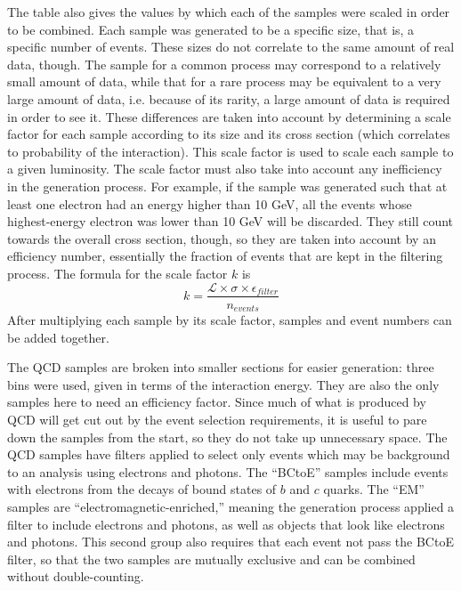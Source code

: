 The table also gives the values by which each 
of the samples were scaled in order to be combined.  
Each sample was generated to be a specific size, 
that is, a specific number of events.  
These sizes do not correlate to the same amount 
of real data, though.  
The sample for a common process may correspond 
to a relatively small amount of data, 
while that for a rare process may be equivalent 
to a very large amount of data, %
i.e. because of its rarity, a large amount 
of data is required in order to see it.  
These differences are taken into account by 
determining a scale factor for each sample 
according to its size and its cross section 
(which correlates to probability of the interaction).  
This scale factor is used to scale each sample 
to a given luminosity.  
The scale factor must also take into account 
any inefficiency in the generation process.  
For example, if the sample was generated such that 
at least one electron had an energy higher than 10 GeV, 
all the events whose highest-energy electron was 
lower than 10 GeV will be discarded.  
They still count towards the overall cross section, 
though, so they are taken into account by 
an efficiency number, 
essentially the fraction of events that are kept 
in the filtering process.  
The formula for the scale factor $k$ is 
\[
k = \frac{ \mathcal{L} \times \sigma \times \epsilon_{filter} }{n_{events}}
\]
After multiplying each sample by its scale factor, 
samples and event numbers can be added together.  

The QCD samples are broken into smaller 
sections for easier generation: 
three bins were used, 
given in terms of the interaction energy.  
They are also the only samples here 
to need an efficiency factor. 
Since much of what is produced by QCD 
will get cut out by the 
event selection requirements, 
it is useful to pare down the samples 
from the start, 
so they do not take up unnecessary space.  
The QCD samples have filters applied to 
select only events which may be background 
to an analysis using electrons and photons.  
The ``BCtoE'' samples include 
events with electrons 
from the decays of bound states of $b$ and $c$ 
quarks.  
The ``EM'' samples are 
``electromagnetic-enriched,'' 
meaning the generation process applied 
a filter to include electrons and photons, 
as well as objects that look like 
electrons and photons.  
This second group also requires that 
each event not pass the BCtoE filter, 
so that the two samples are mutually exclusive 
and can be combined without 
double-counting.  


